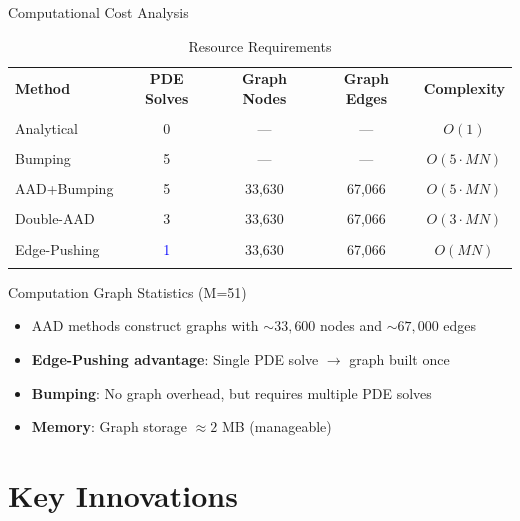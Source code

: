 \documentclass[aspectratio=169]{beamer}
\begin{document}
\begin{frame}{Computational Cost Analysis}
\begin{table}
\centering
\caption{Resource Requirements}
\begin{tabular}{lcccc}
\toprule
\textbf{Method} & \textbf{PDE Solves} & \textbf{Graph Nodes} & \textbf{Graph Edges} & \textbf{Complexity} \\\\
\midrule
Analytical      & 0 & --- & --- & $O(1)$ \\\\
Bumping         & 5 & --- & --- & $O(5 \cdot MN)$ \\\\
AAD+Bumping     & 5 & 33,630 & 67,066 & $O(5 \cdot MN)$ \\\\
Double-AAD      & 3 & 33,630 & 67,066 & $O(3 \cdot MN)$ \\\\
Edge-Pushing    & \textcolor{blue}{1} & 33,630 & 67,066 & $O(MN)$ \\\\
\bottomrule
\end{tabular}
\end{table}

\begin{block}{Computation Graph Statistics (M=51)}
\begin{itemize}
    \item AAD methods construct graphs with $\sim33,600$ nodes and $\sim67,000$ edges
    \item \textbf{Edge-Pushing advantage}: Single PDE solve $\rightarrow$ graph built once
    \item \textbf{Bumping}: No graph overhead, but requires multiple PDE solves
    \item \textbf{Memory}: Graph storage $\approx 2$ MB (manageable)
\end{itemize}
\end{block}
\end{frame}

\section{Key Innovations}
\end{document}
